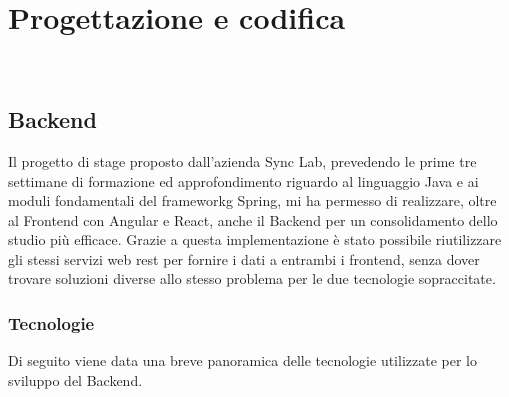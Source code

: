 
\chapter{Progettazione e codifica}
\label{cap:progettazione-codifica}

\\

\section{Backend}
Il progetto di stage proposto dall'azienda Sync Lab, prevedendo le prime tre settimane di formazione ed approfondimento riguardo al linguaggio Java e ai moduli fondamentali del \gls{frameworkg} Spring, mi ha permesso di realizzare, oltre al Frontend con Angular e React, anche il Backend per un consolidamento dello studio più efficace. Grazie a questa implementazione è stato possibile riutilizzare gli stessi servizi web \gls{rest} per fornire i dati a entrambi i \gls{frontend}, senza dover trovare soluzioni diverse allo stesso problema per le due tecnologie sopraccitate.

\subsection{Tecnologie}
Di seguito viene data una breve panoramica delle tecnologie utilizzate per lo sviluppo del Backend.

